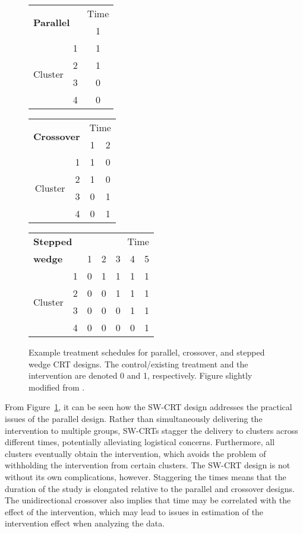 \documentclass[10pt]{article}
\begin{document}
\begin{figure}[H]
\centering
\begin{tabular}{@{}rr|c@{}}
\multicolumn{2}{l|}{\multirow{2}{*}{\textbf{Parallel}}} & \multicolumn{1}{r}{Time} \\
& & 1 \\
\hline
\multirow{4}{*}{Cluster} & 1 & 1 \\
& 2 & 1 \\
& 3 & 0 \\
& 4 & 0
\end{tabular}
\qquad
\begin{tabular}{@{}rr|cc@{}}
\multicolumn{2}{l|}{\multirow{2}{*}{\textbf{Crossover}}} & \multicolumn{2}{r}{Time} \\
& & 1 & 2 \\
\hline
\multirow{4}{*}{Cluster} & 1 & 1 & 0 \\
& 2 & 1 & 0 \\
& 3 & 0 & 1\\
& 4 & 0 & 1
\end{tabular}
\qquad
\begin{tabular}{@{}rr|ccccc@{}}
\multicolumn{2}{l|}{\textbf{Stepped}} & \multicolumn{5}{r}{Time} \\
 \multicolumn{2}{l|}{\textbf{wedge}} & 1 & 2 & 3 & 4 & 5 \\
\hline
\multirow{4}{*}{Cluster} & 1 & 0 & 1 & 1 & 1 & 1 \\
& 2 & 0 & 0 & 1 & 1 & 1 \\
& 3 & 0 & 0 & 0 & 1 & 1 \\
& 4 & 0 & 0 & 0 & 0 & 1
\end{tabular}
\caption{Example treatment schedules for parallel, crossover, and stepped wedge CRT designs. The control/existing treatment and the intervention are denoted 0 and 1, respectively. Figure slightly modified from \parencite{Hussey:2007}.}
\label{fig:designs}
\end{figure}

From Figure~\ref{fig:designs}, it can be seen how the SW-CRT design addresses the practical issues of the parallel design. Rather than simultaneously delivering the intervention to multiple groups, SW-CRTs stagger the delivery to clusters across different times, potentially alleviating logistical concerns. Furthermore, all clusters eventually obtain the intervention, which avoids the problem of withholding the intervention from certain clusters. The SW-CRT design is not without its own complications, however. Staggering the times means that the duration of the study is elongated relative to the parallel and crossover designs. The unidirectional crossover also implies that time may be correlated with the effect of the intervention, which may lead to issues in estimation of the intervention effect when analyzing the data.
\\
\end{document}
